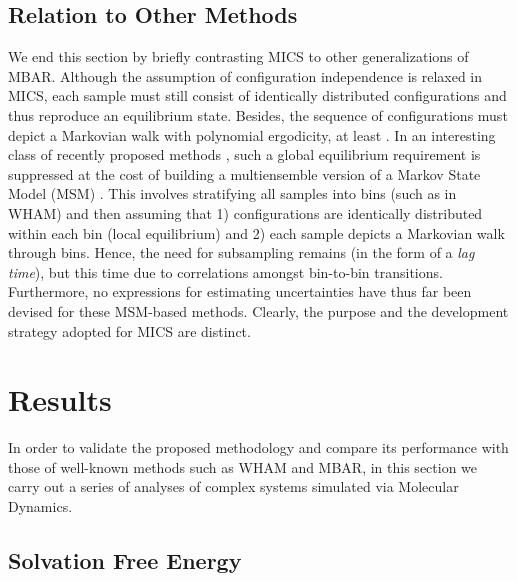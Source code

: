\documentclass[
    journal=jctcce,
    layout=twocolumn
]{achemso}
\begin{document}
\subsection{Relation to Other Methods}

We end this section by briefly contrasting MICS to other generalizations of MBAR. Although the assumption of configuration independence is relaxed in MICS, each sample must still consist of identically distributed configurations and thus reproduce an equilibrium state. Besides, the sequence of configurations must depict a Markovian walk with polynomial ergodicity, at least \cite{Roy_2018}. In an interesting class of recently proposed methods \cite{Mey_2014, Wu_2014, Rosta_2015, Wu_2016}, such a global equilibrium requirement is suppressed at the cost of building a multiensemble version \cite{Wu_2016} of a Markov State Model (MSM) \cite{Pande_2010, Husic_2018}. This involves stratifying all samples into bins (such as in WHAM) and then assuming that 1) configurations are identically distributed within each bin (local equilibrium) and 2) each sample depicts a Markovian walk through bins. Hence, the need for subsampling remains (in the form of a \textit{lag time}), but this time due to correlations amongst bin-to-bin transitions. Furthermore, no expressions for estimating uncertainties have thus far been devised for these MSM-based methods. Clearly, the purpose and the development strategy adopted for MICS are distinct.

\section{Results}

In order to validate the proposed methodology and compare its performance with those of well-known methods such as WHAM and MBAR, in this section we carry out a series of analyses of complex systems simulated via Molecular Dynamics.

\subsection{Solvation Free Energy}
\label{sec:solvation free energy}
\end{document}
